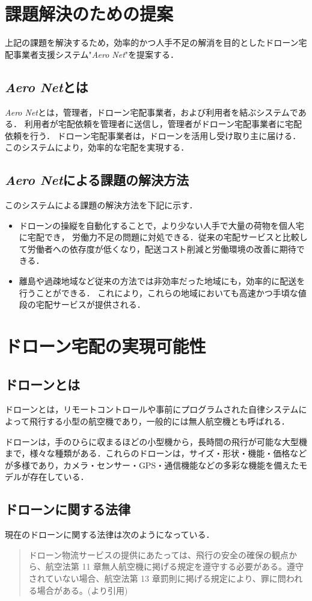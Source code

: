 \documentclass[a4paper, titlepage]{jsarticle}
\newcommand{\system}{\textsl{Aero Net}}
\begin{document}
\section{課題解決のための提案}
上記の課題を解決するため，効率的かつ人手不足の解消を目的としたドローン宅配事業者支援システム"\system "を提案する．
\subsection{\system とは}
\system とは，管理者，ドローン宅配事業者，および利用者を結ぶシステムである．
利用者が宅配依頼を管理者に送信し，管理者がドローン宅配事業者に宅配依頼を行う．
ドローン宅配事業者は，ドローンを活用し受け取り主に届ける．
このシステムにより，効率的な宅配を実現する．
\subsection{\system による課題の解決方法}
このシステムによる課題の解決方法を下記に示す．
\begin{itemize}
  \item ドローンの操縦を自動化することで，より少ない人手で大量の荷物を個人宅に宅配でき，
        労働力不足の問題に対処できる．従来の宅配サービスと比較して労働者への依存度が低くなり，配送コスト削減と労働環境の改善に期待できる．
  \item 離島や過疎地域など従来の方法では非効率だった地域にも，効率的に配送を行うことができる．
        これにより，これらの地域においても高速かつ手頃な値段の宅配サービスが提供される．
\end{itemize}

\section{ドローン宅配の実現可能性}
\subsection{ドローンとは}
ドローンとは，リモートコントロールや事前にプログラムされた自律システムによって飛行する小型の航空機であり，一般的には無人航空機とも呼ばれる．

ドローンは，手のひらに収まるほどの小型機から，長時間の飛行が可能な大型機まで，様々な種類がある．これらのドローンは，サイズ・形状・機能・価格などが多様であり，カメラ・センサー・GPS・通信機能などの多彩な機能を備えたモデルが存在している．

\subsection{ドローンに関する法律}
現在のドローンに関する法律は次のようになっている．
\begin{quote}
  ドローン物流サービスの提供にあたっては、飛行の安全の確保の観点から、航空法第 11 章無人航空機に掲げる規定を遵守する必要がある。遵守されていない場合、航空法第 13 章罰則に掲げる規定により、罪に問われる場合がある。(\cite{delivery_guidelines_2023}より引用)
\end{quote}
\end{document}
